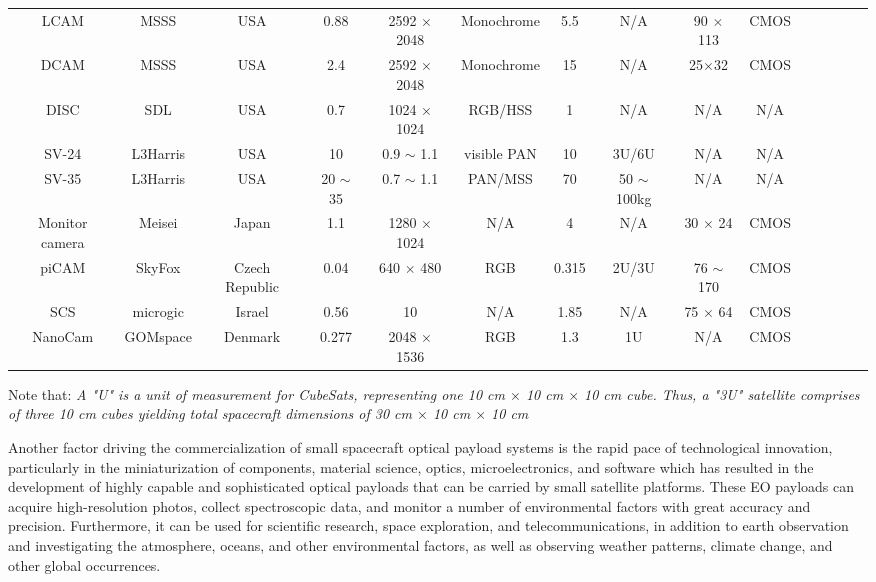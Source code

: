 \documentclass[final,5p,times,twocolumn,authoryear]{elsarticle}
\begin{document}
\begin{table}
{\begin{tabular}{c c c c c c c c c c c c c c c}
			LCAM & MSSS & USA & 0.88 & 2592 $\times$ 2048 &  Monochrome & 5.5 &  N/A &90 $\times$ 113 & CMOS & \citep{malin2023}\\  
			DCAM & MSSS & USA & 2.4 & 2592 $\times$ 2048 & Monochrome & 15 &  N/A & 25$\times$32 & CMOS & \citep{malin2023}\\  
			DISC & SDL & USA & 0.7 & 1024 $\times$ 1024 &  RGB/HSS & 1 &  N/A & N/A & N/A & \citep{sdl2023}\\
			SV-24 & L3Harris & USA & 10 & 0.9 $\sim$  1.1 &  visible PAN & 10 & 3U/6U & N/A & N/A & \citep{harris2023}\\
			SV-35 & L3Harris & USA & 20 $\sim$ 35 & 0.7 $\sim$ 1.1 &  PAN/MSS & 70 &  50 $\sim$ 100kg & N/A & N/A & \citep{harris2023}\\
			Monitor camera & Meisei & Japan & 1.1 & 1280 $\times$ 1024 & N/A & 4 & N/A & 30 $\times$ 24 & CMOS &  \citep{meisei2023}\\ 
			piCAM & SkyFox & Czech Republic & 0.04 & 640 $\times$ 480&  RGB & 0.315 &  2U/3U & 76 $\sim$ 170 & CMOS & \citep{skyfox2023}\\ 
			SCS & microgic & Israel & 0.56 & 10 &  N/A & 1.85 &  N/A & 75 $\times$ 64 & CMOS & \citep{micro2023}\\
			NanoCam  & GOMspace & Denmark & 0.277 & 2048 $\times$ 1536 &  RGB & 1.3 &  1U & N/A & CMOS & \citep{gomspace2023}\\
			\hline
		\end{tabular}
	}
	\label{table:nonlin} %
	\vspace{1ex}
	\raggedright{Note that: \textit{A "U" is a unit of measurement for CubeSats, representing one 10 cm $\times$ 10 cm $\times$ 10 cm cube. Thus, a "3U" satellite comprises of three 10 cm cubes yielding total spacecraft dimensions of 30 cm $\times$ 10 cm $\times$ 10 cm}}
	
\end{table}
Another factor driving the commercialization of small spacecraft optical payload systems is the rapid pace of technological innovation, particularly in the miniaturization of components, material science, optics, microelectronics, and software which has resulted in the development of highly capable and sophisticated optical payloads that can be carried by small satellite platforms. These EO payloads can acquire high-resolution photos, collect spectroscopic data, and monitor a number of environmental factors with great accuracy and precision. Furthermore, it can be used for scientific research, space exploration, and telecommunications, in addition to earth observation and investigating the atmosphere, oceans, and other environmental factors, as well as observing weather patterns, climate change, and other global occurrences.\\
\end{document}

